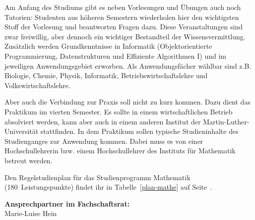 Am Anfang des Studiums gibt es neben Vorlesungen und Übungen auch noch Tutorien:
Studenten aus höheren Semestern wiederholen hier den wichtigsten Stoff der Vorlesung und beantworten Fragen dazu.
Diese Veranstaltungen sind zwar freiwillig, aber dennoch ein wichtiger Bestandteil der Wissensvermittlung.
Zusätzlich werden Grundkenntnisse in Informatik (Objektorientierte Programmierung, Datenstrukturen und Effiziente Algorithmen I) und im jeweiligen Anwendungsgebiet erworben. 
Als Anwendungsfächer wählbar sind z.B. Biologie, Chemie, Physik, Informatik, Betriebswirtschaftslehre und Volkswirtschaftslehre.

Aber auch die Verbindung zur Praxis soll nicht zu kurz kommen.
Dazu dient das Praktikum im vierten Semester.
Es sollte in einem wirtschaftlichen Betrieb absolviert werden, kann aber auch in einem anderen Institut der Martin-Luther-Universität stattfinden.
In dem Praktikum sollen typische Studieninhalte des Studienganges zur Anwendung kommen.
Dabei muss es von einer Hochschullehrerin bzw. einem Hochschullehrer des Instituts für Mathematik betreut werden.

Den Regelstudienplan für das Studienprogramm Mathematik (180~Leistungspunkte) findet ihr in Tabelle~\ref{plan-mathe} auf Seite~\pageref{plan-mathe}.

\textbf{Ansprechpartner im Fachschaftsrat:}\\
Marie-Luise Hein\\


